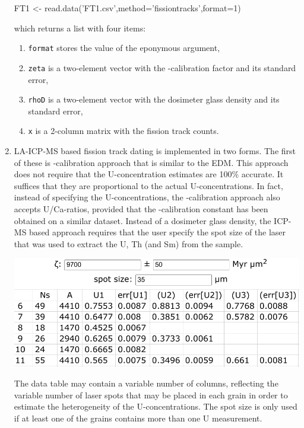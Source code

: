 \begin{refsection}
\begin{enumerate}
\begin{console}
FT1 <- read.data('FT1.csv',method='fissiontracks',format=1)
\end{console}

\noindent which returns a list with four items:

\begin{enumerate}
\item\texttt{format} stores the value of the eponymous argument,
\item\texttt{zeta} is a two-element vector with the
  \textzeta-calibration factor and its standard error,
\item\texttt{rhoD} is a two-element vector with the dosimeter glass
  density and its standard error,
\item\texttt{x} is a 2-column matrix with the fission track counts.
\end{enumerate}

\item LA-ICP-MS based fission track dating is implemented in two
  forms.  The first of these is \textzeta-calibration approach that is
  similar to the EDM. This approach does not require that the
  U-concentration estimates are 100\% accurate. It suffices that they
  are proportional to the actual U-concentrations. In fact, instead of
  specifying the U-concentrations, the \textzeta-calibration approach
  also accepts U/Ca-ratios, provided that the \textzeta-calibration
  constant has been obtained on a similar dataset.  Instead of a
  dosimeter glass density, the ICP-MS based approach requires that the
  user specify the spot size of the laser that was used to extract the
  U, Th (and Sm) from the sample.

\noindent\begin{minipage}[t]{.60\linewidth}
\strut\vspace*{-\baselineskip}\newline
\includegraphics[width=\linewidth]{../figures/FTICPzeta.png}
\end{minipage}
\begin{minipage}[t]{.40\linewidth}
   The data table may contain a variable number of columns, reflecting
   the variable number of laser spots that may be placed in each grain
   in order to estimate the heterogeneity of the U-concentrations. The
   spot size is only used if at least one of the grains contains more
   than one U measurement.
\end{minipage}


\end{enumerate}
\end{refsection}
